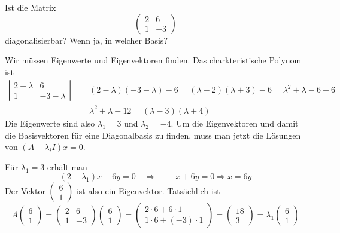 Ist die Matrix
\[
\begin{pmatrix}
2&6\\
1&-3
\end{pmatrix}
\]
diagonalisierbar? Wenn ja, in welcher Basis?


\begin{loesung}
Wir müssen Eigenwerte und Eigenvektoren finden. Das charkteristische
Polynom ist
\begin{align*}
\left|\begin{matrix}
2-\lambda&6\\
1&-3-\lambda
\end{matrix}\right|
&=(2-\lambda)(-3-\lambda)-6=(\lambda-2)(\lambda+3)-6=\lambda^2+\lambda-6-6
\\
&=\lambda^2+\lambda-12=(\lambda-3)(\lambda + 4)
\end{align*}
Die Eigenwerte sind also $\lambda_1=3$ und $\lambda_2=-4$.
Um die Eigenvektoren und damit
die Basisvektoren für eine Diagonalbasis zu finden, muss man
jetzt die Lösungen von $(A-\lambda_i I)x=0$.

Für $\lambda_1=3$ erhält man
\[
(2-\lambda_1)x+6y=0\quad\Rightarrow\quad -x+6y=0\Rightarrow x = 6y
\]
Der Vektor
$\begin{pmatrix}6\\1\end{pmatrix}$
ist also ein Eigenvektor. Tatsächlich ist
\[
A\begin{pmatrix}6\\1\end{pmatrix}
=
\begin{pmatrix}
2&6\\
1&-3
\end{pmatrix}
\begin{pmatrix}6\\1\end{pmatrix}
=\begin{pmatrix}
2\cdot 6+6\cdot 1\\
1\cdot 6+(-3)\cdot 1
\end{pmatrix}
=\begin{pmatrix}
18\\
3
\end{pmatrix}
=
\lambda_1 
\begin{pmatrix}6\\1\end{pmatrix}
\]


\end{loesung}

